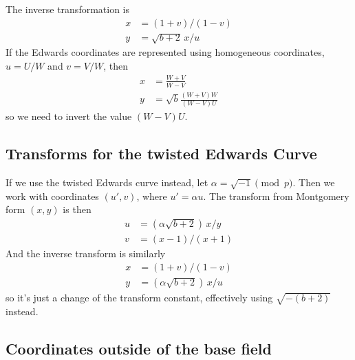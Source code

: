 \documentclass[a4paper]{article}
\begin{document}
The inverse transformation is
\begin{align*}
  x &= (1+v) / (1-v) \\
  y &= \sqrt{b+2} \, x / u 
\end{align*}
If the Edwards coordinates are represented using homogeneous
coordinates, $u = U/W$ and $v = V/W$, then
\begin{align*}
  x &= \frac{W+V}{W-V} \\
  y &= \sqrt{b} \frac{(W+V) W}{(W-V) U} 
\end{align*}
so we need to invert the value $(W-V) U$.

\subsection{Transforms for the twisted Edwards Curve}

If we use the twisted Edwards curve instead, let $\alpha = \sqrt{-1}
\pmod{p}$. Then we work with coordinates $(u', v)$, where $u' = \alpha
u$. The transform from Montgomery form $(x, y)$ is then
\begin{align*}
  u &= (\alpha \sqrt{b+2}) \, x / y\\
  v &= (x-1) / (x+1)
\end{align*}
And the inverse transform is similarly
\begin{align*}
  x &= (1+v) / (1-v) \\
  y &= (\alpha \sqrt{b+2}) \, x / u 
\end{align*}
so it's just a change of the transform constant, effectively using
$\sqrt{-(b+2)}$ instead.

\subsection{Coordinates outside of the base field}
\end{document}
